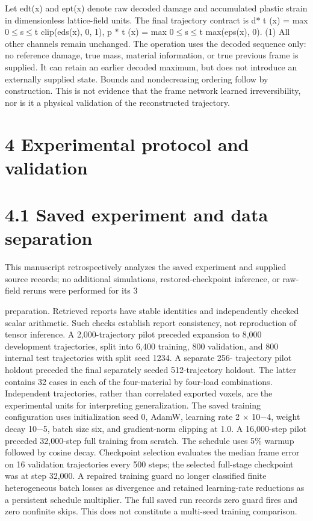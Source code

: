 \documentclass[11pt]{article}
\begin{document}
Let edt(x) and ept(x) denote raw decoded damage and accumulated plastic strain in dimensionless
lattice-field units. The final trajectory contract is
d\ensuremath{\ast}
t (x) = max
0\ensuremath{\leq}s\ensuremath{\leq}t
clip(eds(x), 0, 1), p \ensuremath{\ast}
t (x) = max
0\ensuremath{\leq}s\ensuremath{\leq}t
max(eps(x), 0). (1)
All other channels remain unchanged. The operation uses the decoded sequence only: no reference
damage, true mass, material information, or true previous frame is supplied. It can retain an earlier
decoded maximum, but does not introduce an externally supplied state. Bounds and nondecreasing
ordering follow by construction. This is not evidence that the frame network learned irreversibility,
nor is it a physical validation of the reconstructed trajectory.

\section*{4 Experimental protocol and validation}


\section*{4.1 Saved experiment and data separation}

This manuscript retrospectively analyzes the saved experiment and supplied source records; no
additional simulations, restored-checkpoint inference, or raw-field reruns were performed for its
3

preparation. Retrieved reports have stable identities and independently checked scalar arithmetic.
Such checks establish report consistency, not reproduction of tensor inference.
A 2,000-trajectory pilot preceded expansion to 8,000 development trajectories, split into 6,400
training, 800 validation, and 800 internal test trajectories with split seed 1234. A separate 256-
trajectory pilot holdout preceded the final separately seeded 512-trajectory holdout. The latter
contains 32 cases in each of the four-material by four-load combinations. Independent trajectories,
rather than correlated exported voxels, are the experimental units for interpreting generalization.
The saved training configuration uses initialization seed 0, AdamW, learning rate 2 \ensuremath{\times} 10\ensuremath{-}4,
weight decay 10\ensuremath{-}5, batch size six, and gradient-norm clipping at 1.0. A 16,000-step pilot preceded
32,000-step full training from scratch. The schedule uses 5\% warmup followed by cosine decay.
Checkpoint selection evaluates the median frame error on 16 validation trajectories every 500 steps;
the selected full-stage checkpoint was at step 32,000. A repaired training guard no longer classified
finite heterogeneous batch losses as divergence and retained learning-rate reductions as a persistent
schedule multiplier. The full saved run records zero guard fires and zero nonfinite skips. This does
not constitute a multi-seed training comparison.
\end{document}
